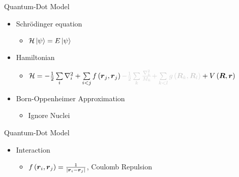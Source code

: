 \documentclass[10pt, t, xcolor=dvipsnames]{beamer}
\begin{document}
\begin{frame}[fragile]{Quantum-Dot Model}
    \begin{itemize}
        \item Schrödinger equation 
            \begin{itemize}
                \item $\mathcal{H}\ket{\psi} = E\ket{\psi}$
            \end{itemize}
        \item Hamiltonian
            \begin{itemize}
                \item $\mathcal{H} = - \frac{1}{2} \sum\limits_i \nabla^2_i +
                    \sum\limits_{i<j} f\left(\blds{r}_j, \blds{r}_j\right)
                    {\color{black!20}{-\frac{1}{2} \sum\limits_k
                    \frac{\nabla^2_k}{M_k}}} {\color{black!20}{+
                    \sum\limits_{k<l} g\left(\blds{R}_k,\blds{R}_l\right)}} +
                    V\left(\blds{R},\blds{r}\right)$
            \end{itemize}
        \item Born-Oppenheimer Approximation
            \begin{itemize}
                \item Ignore Nuclei
            \end{itemize}
    \end{itemize}
\end{frame}

\begin{frame}[fragile]{Quantum-Dot Model}
    \begin{itemize}
        \item Interaction
            \begin{itemize}
                \item $f\left(\bm{{r}}_i, \bm{{r}}_j\right) =
                    \frac{1}{\abs{\bm{{r}}_i - \bm{{r}}_j}}$,\hspace{2cm} Coulomb Repulsion
            \end{itemize}
    \end{itemize}
\end{frame}
\end{document}
